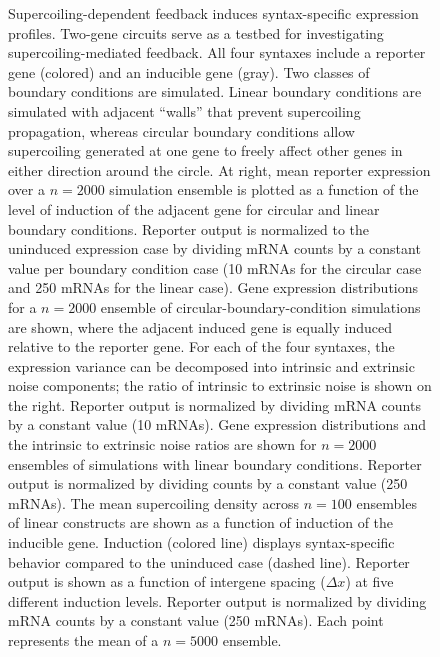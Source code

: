 \documentclass[11pt]{article}
\begin{document}
\begin{figure}
    \ContinuedFloat
    \caption{Supercoiling-dependent feedback induces syntax-specific expression profiles.
         Two-gene circuits serve as a testbed for investigating supercoiling-mediated feedback. All four syntaxes include a reporter gene (colored) and an inducible gene (gray).
         Two classes of boundary conditions are simulated. Linear boundary conditions are simulated with adjacent ``walls'' that prevent supercoiling propagation, whereas circular boundary conditions allow supercoiling generated at one gene to freely affect other genes in either direction around the circle. At right, mean reporter expression over a \(n=2000\) simulation ensemble is plotted as a function of the level of induction of the adjacent gene for circular and linear boundary conditions. Reporter output is normalized to the uninduced expression case by dividing mRNA counts by a constant value per boundary condition case (10 mRNAs for the circular case and 250 mRNAs for the linear case).
         Gene expression distributions for a \(n = 2000\) ensemble of circular-boundary-condition simulations are shown, where the adjacent induced gene is equally induced relative to the reporter gene. For each of the four syntaxes, the expression variance can be decomposed into intrinsic and extrinsic noise components; the ratio of intrinsic to extrinsic noise is shown on the right. Reporter output is normalized by dividing mRNA counts by a constant value (10 mRNAs).
         Gene expression distributions and the intrinsic to extrinsic noise ratios are shown for \(n = 2000\) ensembles of simulations with linear boundary conditions. Reporter output is normalized by dividing counts by a constant value (250 mRNAs).
         The mean supercoiling density across \(n = 100\) ensembles of linear constructs are shown as a function of induction of the inducible gene. Induction (colored line) displays syntax-specific behavior compared to the uninduced case (dashed line).
         Reporter output is shown as a function of intergene spacing (\(\Delta x\)) at five different induction levels. Reporter output is normalized by dividing mRNA counts by a constant value (250 mRNAs). Each point represents the mean of a \(n=5000\) ensemble.
    } \label{fig:top:orientation_bc_behavior}
\end{figure}
\end{document}
